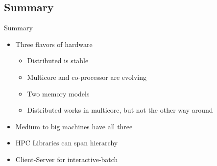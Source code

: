 \subsection{Summary}
\makesubcontentsslidessec

\begin{frame}
  \begin{block}{Summary}
    \begin{itemize}
    \item Three flavors of hardware
      \begin{itemize}
      \item Distributed is stable
      \item Multicore and co-processor are evolving
      \item Two memory models
      \item Distributed works in multicore, but not the other way around
      \end{itemize}
    \item Medium to big machines have all three
    \item HPC Libraries can span hierarchy
    \item Client-Server for interactive-batch
    \end{itemize}
  \end{block}
\end{frame}